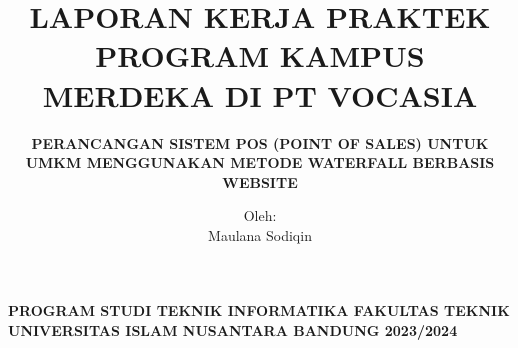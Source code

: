 
\title{
	\centering
	\Large
	\textbf{LAPORAN KERJA PRAKTEK PROGRAM KAMPUS MERDEKA
		DI PT VOCASIA}
}

\subtitle{
	\centering
	\textbf{PERANCANGAN SISTEM POS (POINT OF SALES) UNTUK UMKM MENGGUNAKAN METODE WATERFALL BERBASIS WEBSITE}
}

\author{Oleh: \\ Maulana Sodiqin}



\maketitle

\begin{center}
	\centering
	\textbf{
		PROGRAM STUDI TEKNIK INFORMATIKA
		FAKULTAS TEKNIK
		UNIVERSITAS ISLAM NUSANTARA
		BANDUNG
		2023/2024
	}
\end{center}
